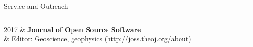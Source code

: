 \documentclass[oneside]{cv}
\newcommand{\heading}[1]{
    \vspace{0.7cm}
    {\HelveticaNeueUltraLight\fontsize{18pt}{0}\selectfont #1}\\
    \vspace{-0.2cm}
    \hrule
    \vspace{0.4cm}
}
\begin{document}
\heading{Service and Outreach}

\begin{entryright}
2017 & \textbf{Journal of Open Source Software} \\
& Editor: Geoscience, geophysics (\href{http://joss.theoj.org/about}{http://joss.theoj.org/about})
\end{entryright}



\end{document}
